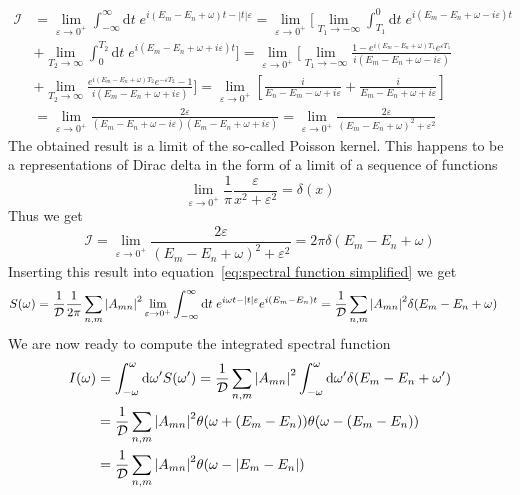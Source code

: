 \begin{align}
    \mathcal{I} &= \lim _{\varepsilon \to 0^+} \int_{-\infty}^{\infty} \mathrm{d} t \; 
    e^{ i (E_m-E_n+\omega)t -|t| \varepsilon} = \lim _{\varepsilon \to 0^+} 
    \Bigg[\lim_{T_1\to -\infty}\int_{T_1}^{0} \mathrm{d} t \; e^{ i (E_m-E_n+\omega -i \varepsilon)t}\nonumber\\
    &+\lim_{T_2\to \infty}\int_{0}^{T_2} \mathrm{d} t \;  e^{ i (E_m-E_n+\omega + i\varepsilon)t}\Bigg]
    = \lim _{\varepsilon \to 0^+} \Bigg[\lim_{T_1\to -\infty} 
    \frac{1-e^{ i (E_m-E_n+\omega )T_1} e^{\varepsilon T_1}}{i (E_m-E_n+\omega -i \varepsilon)}\nonumber\\
     &+ \lim_{T_2\to \infty} \frac{e^{ i (E_m-E_n+\omega )T_2} e^{-\varepsilon T_2}-1}
    {i (E_m-E_n+\omega +i \varepsilon)}\Bigg]
    = \lim _{\varepsilon \to 0^+} \left[\frac{i}{E_n-E_m-\omega +i \varepsilon} + 
    \frac{i}{E_m-E_n+\omega +i \varepsilon} \right]\nonumber\\
     &= \lim _{\varepsilon \to 0^+}
    \frac{2\varepsilon}{(E_m-E_n+\omega -i \varepsilon)(E_m-E_n+\omega +i \varepsilon)}
    =\lim _{\varepsilon \to 0^+} \frac{2\varepsilon}{(E_m-E_n+\omega)^2 +\varepsilon^2}
\end{align}
The obtained result is a limit of the so-called Poisson kernel. This happens to be
a representations of Dirac delta in the form of a limit of a sequence of functions~\autocite{byron1992mathematics}
\begin{equation}
    \lim _{\varepsilon \to 0^+} \frac{1}{\pi} \frac{\varepsilon}{x^2 +\varepsilon^2} = \delta(x) 
\end{equation}
Thus we get
\begin{equation}
    \mathcal{I} = \lim _{\varepsilon \to 0^+} \frac{2\varepsilon}{(E_m-E_n+\omega)^2 +\varepsilon^2}
    = 2\pi \delta(E_m-E_n+\omega)
\end{equation}
Inserting this result into equation~\eqref{eq:spectral function simplified} we get
\begin{align}
    S(\omega) &= \frac{1}{\mathcal{D}} \frac{1}{2 \pi}\sum_{n,m} \abs{A_{mn}}^2  
    \lim _{\varepsilon \to 0^+} \int_{-\infty}^{\infty} \mathrm{d} t \; e^{i \omega t-|t| 
    \varepsilon}e^{i (E_m-E_n) t} = \frac{1}{\mathcal{D}}\sum_{n,m} \abs{A_{mn}}^2 \delta(E_m-E_n+\omega)
\end{align}
We are now ready to compute the integrated spectral function
\begin{align}
    I(\omega) &= \int_{-\omega}^{\omega} \mathrm{d}\omega^{\prime} S(\omega^{\prime}) =
    \frac{1}{\mathcal{D}}\sum_{n,m} \abs{A_{mn}}^2 \int_{-\omega}^{\omega} \mathrm{d}\omega^{\prime} 
    \delta(E_m-E_n+\omega^{\prime}) \nonumber \\ &= \frac{1}{\mathcal{D}}\sum_{n,m} \abs{A_{mn}}^2
    \theta(\omega + (E_m-E_n))\theta(\omega - (E_m-E_n)) \nonumber\\
    &= \frac{1}{\mathcal{D}}\sum_{n,m} \abs{A_{mn}}^2\theta(\omega - \abs{E_m-E_n})
\end{align}


